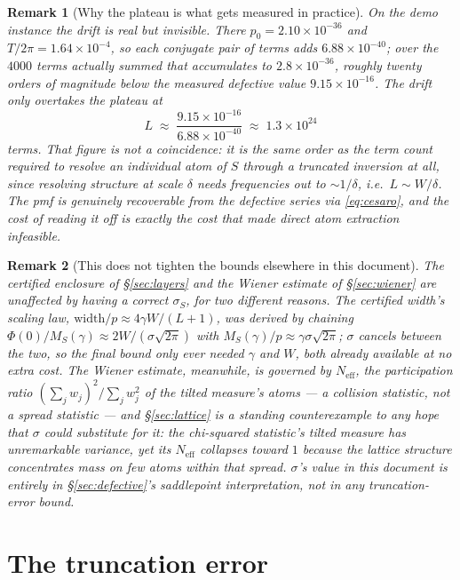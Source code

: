 \documentclass[11pt]{article}
\newtheorem{remark}{Remark}
\newcommand{\Neff}{N_{\mathrm{eff}}}
\begin{document}
\begin{remark}[Why the plateau is what gets measured in practice]
On the demo instance the drift is real but invisible. There $p_0=2.10\times10^{-36}$ and
$T/2\pi=1.64\times10^{-4}$, so each conjugate pair of terms adds $6.88\times10^{-40}$; over the
$4000$ terms actually summed that accumulates to $2.8\times10^{-36}$, roughly twenty orders of
magnitude below the measured defective value $9.15\times10^{-16}$. The drift only overtakes the
plateau at
\[
  L\;\approx\;\frac{9.15\times10^{-16}}{6.88\times10^{-40}}\;\approx\;1.3\times10^{24}
\]
terms. That figure is not a coincidence: it is the same order as the term count required to resolve
an individual atom of $S$ through a truncated inversion at all, since resolving structure at scale
$\delta$ needs frequencies out to ${\sim}1/\delta$, i.e.\ $L\sim W/\delta$. The pmf is genuinely
recoverable from the defective series via \eqref{eq:cesaro}, and the cost of reading it off is
exactly the cost that made direct atom extraction infeasible.
\end{remark}

\begin{remark}[This does not tighten the bounds elsewhere in this document]
The certified enclosure of \S\ref{sec:layers} and the Wiener estimate of \S\ref{sec:wiener} are
unaffected by having a correct $\sigma_S$, for two different reasons. The certified width's scaling
law, $\mathrm{width}/p\approx4\gamma W/(L+1)$, was derived by chaining
$\Phi(0)/M_S(\gamma)\approx2W/(\sigma\sqrt{2\pi})$ with $M_S(\gamma)/p\approx\gamma\sigma\sqrt{2\pi}$;
$\sigma$ cancels between the two, so the final bound only ever needed $\gamma$ and $W$, both already
available at no extra cost. The Wiener estimate, meanwhile, is governed by $\Neff$, the participation
ratio $(\sum_jw_j)^2/\sum_jw_j^2$ of the tilted measure's atoms — a collision statistic, not a spread
statistic — and \S\ref{sec:lattice} is a standing counterexample to any hope that $\sigma$ could
substitute for it: the chi-squared statistic's tilted measure has unremarkable variance, yet its
$\Neff$ collapses toward $1$ because the lattice structure concentrates mass on few atoms \emph{within}
that spread. $\sigma$'s value in this document is entirely in \S\ref{sec:defective}'s saddlepoint
interpretation, not in any truncation-error bound.
\end{remark}

\section{The truncation error}
\label{sec:trunc}
\end{document}
